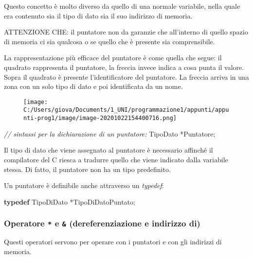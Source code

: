 \documentclass[
]{article}
\newenvironment{Shaded}{}{}
\newcommand{\CommentTok}[1]{\textcolor[rgb]{0.38,0.63,0.69}{\textit{#1}}}
\newcommand{\KeywordTok}[1]{\textcolor[rgb]{0.00,0.44,0.13}{\textbf{#1}}}
\newcommand{\NormalTok}[1]{#1}
\begin{document}
Questo concetto è molto diverso da quello di una normale variabile,
nella quale era contenuto sia il tipo di dato sia il suo indirizzo di
memoria.

ATTENZIONE CHE: il puntatore non da garanzie che all'interno di quello
spazio di memoria ci sia qualcosa o se quello che è presente sia
comprensibile.

La rappresentazione più efficace del puntatore è come quella che segue:
il quadrato rappresenta il puntatore, la freccia invece indica a cosa
punta il valore. Sopra il quadrato è presente l'identificatore del
puntatore. La freccia arriva in una zona con un solo tipo di dato e poi
identificata da un nome.

\begin{figure}
\centering
\texttt{[image: C:/Users/giova/Documents/1\_UNI/programmazione1/appunti/appunti-prog1/image/image-20201022154400716.png]}
\caption{}
\end{figure}

\begin{Shaded}
\begin{Highlighting}[]
\CommentTok{// sintassi per la dichiarazione di un puntatore:}
\NormalTok{TipoDato *Puntatore;}
\end{Highlighting}
\end{Shaded}

Il tipo di dato che viene assegnato al puntatore è necessario affinché
il compilatore del C riesca a tradurre quello che viene indicato dalla
variabile stessa. Di fatto, il puntatore non ha un tipo predefinito.

Un puntatore è definibile anche attraverso un \emph{typedef}:

\begin{Shaded}
\begin{Highlighting}[]
\KeywordTok{typedef}\NormalTok{ TipoDiDato *TipoDiDatoPuntato;}
\end{Highlighting}
\end{Shaded}

\hypertarget{header-n664}{%
\subsubsection{\texorpdfstring{Operatore \texttt{*} e \texttt{\&}
(dereferenziazione e indirizzo
di)}{Operatore * e \& (dereferenziazione e indirizzo di)}}\label{header-n664}}

Questi operatori servono per operare con i puntatori e con gli indirizzi
di memoria.
\end{document}
